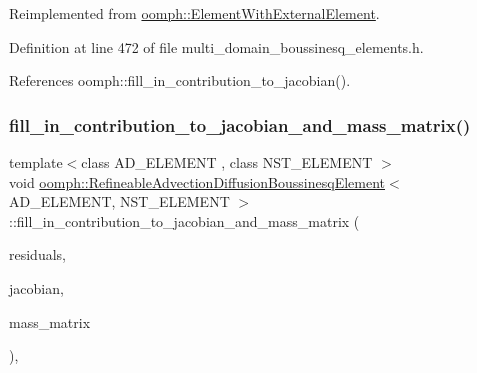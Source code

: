 Reimplemented from \hyperlink{classoomph_1_1ElementWithExternalElement_ae5fb09552a8271e891438f8d058ca1b8}{oomph\+::\+Element\+With\+External\+Element}.



Definition at line 472 of file multi\+\_\+domain\+\_\+boussinesq\+\_\+elements.\+h.



References oomph\+::fill\+\_\+in\+\_\+contribution\+\_\+to\+\_\+jacobian().

\mbox{\label{classoomph_1_1RefineableAdvectionDiffusionBoussinesqElement_a25627bf0853bda6c520a2b1c2c602af4}} 
\subsubsection{\texorpdfstring{fill\+\_\+in\+\_\+contribution\+\_\+to\+\_\+jacobian\+\_\+and\+\_\+mass\+\_\+matrix()}{fill\_in\_contribution\_to\_jacobian\_and\_mass\_matrix()}}
{\footnotesize\ttfamily template$<$class A\+D\+\_\+\+E\+L\+E\+M\+E\+NT , class N\+S\+T\+\_\+\+E\+L\+E\+M\+E\+NT $>$ \\
void \hyperlink{classoomph_1_1RefineableAdvectionDiffusionBoussinesqElement}{oomph\+::\+Refineable\+Advection\+Diffusion\+Boussinesq\+Element}$<$ A\+D\+\_\+\+E\+L\+E\+M\+E\+NT, N\+S\+T\+\_\+\+E\+L\+E\+M\+E\+NT $>$\+::fill\+\_\+in\+\_\+contribution\+\_\+to\+\_\+jacobian\+\_\+and\+\_\+mass\+\_\+matrix (\begin{DoxyParamCaption}\item[{\hyperlink{classoomph_1_1Vector}{Vector}$<$ double $>$ \&}]{residuals,  }\item[{\hyperlink{classoomph_1_1DenseMatrix}{Dense\+Matrix}$<$ double $>$ \&}]{jacobian,  }\item[{\hyperlink{classoomph_1_1DenseMatrix}{Dense\+Matrix}$<$ double $>$ \&}]{mass\+\_\+matrix }\end{DoxyParamCaption})\hspace{0.3cm}{\ttfamily [inline]}, {\ttfamily [virtual]}}



